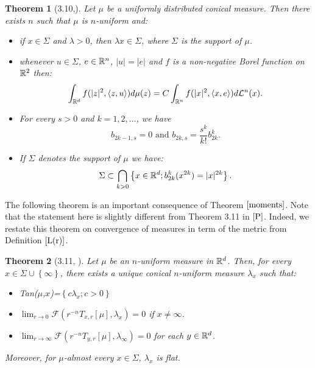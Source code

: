 \documentclass[11pt]{article}
\newtheorem{theorem}{Theorem}[section]
\theoremstyle{definition}
\theoremstyle{remark}
\numberwithin{equation}{section}
\begin{document}
\begin{theorem}[3.10,\cite{P}] \label{momentsconical}
Let $\mu$ be a uniformly distributed conical measure. Then there exists $n$ such that $\mu$ is $n$-uniform and:
\begin{itemize}
\item if $x \in \Sigma$ and $\lambda>0$, then $\lambda x \in \Sigma$, where $\Sigma$ is the support of $\mu$.
\item whenever $u \in \Sigma$, $e \in {\mathbb{R}}^{n}$, $|u|=|e|$ and $f$ is a non-negative Borel function on ${\mathbb{R}}^2$ then:
\begin{equation} \label{protopolar}
\int_{{\mathbb{R}}^d} f({|z|^{2}}, {\langle z,u \rangle}) d\mu(z)= C \int_{{\mathbb{R}}^{n}}f({|x|^2},{\langle x,e \rangle})d\mathcal{L}^{n}(x).
\end{equation}
\item For every $s>0$ and $k=1,2,\ldots$, we have
\begin{equation} \label{conicalevenodd} b_{2k-1,s}=0 \mbox{ and } b_{2k,s}=\frac{s^{k}}{k!} b_{2k}^{k}. \end{equation}
\item If $\Sigma$ denotes the support of $\mu$ we have: \begin{equation}\label{varietyconical} \Sigma \subset \bigcap_{k>0} \left\lbrace x \in {\mathbb{R}}^d ;  b_{2k}^{k} (x^{2k})=|x|^{2k} \right\rbrace. 
\end{equation}
\end{itemize}
\end{theorem}

 The following theorem is an important consequence of Theorem $\ref{moments}$. Note that the statement here is slightly different from Theorem 3.11 in $\cite{P}$. Indeed, we restate this theorem on convergence of measures in term of the metric from Definition $\ref{L(r)}$.
 
 \begin{theorem}[3.11, \cite{P}]\label{uniqueness}
 Let $\mu$ be an $n$-uniform measure in $\mathbb{R}^{d}$. Then, for every $x \in \Sigma \cup \left\lbrace \infty \right\rbrace$, there exists a unique conical $n$-uniform measure ${\lambda}_x$ such that:
 \begin{itemize}
 \item Tan($\mu$,$x$)=$\left\lbrace c \lambda_{x} ; c>0 \right\rbrace$
 \item $\lim_{r \to 0} \mathcal{F}(r^{-n} T_{x,r}[\mu] , {\lambda}_{x})= 0$ if $x \neq \infty$.
 \item $\lim_{r \to \infty} \mathcal{F}(r^{-n} T_{y , r} [\mu] , \lambda_{\infty})=0$ for each $y \in \mathbb{R}^{d}$.
\end{itemize}
 Moreover, for $\mu$-almost every $x \in \Sigma$, ${\lambda}_{x}$ is flat.

\end{theorem}  
\end{document}

